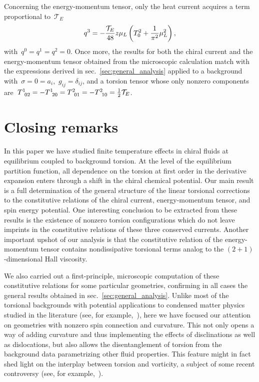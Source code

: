 \documentclass[11pt,a4paper]{article}
\begin{document}
Concerning the energy-momentum tensor, only the heat current acquires a term
proportional to~$\mathcal{T}_{E}$
\begin{align}
q^{3}=-{\mathcal{T}_{E}\over 48}z\mu_{L}\left( T_{0}^{2}+{1\over \pi^{2}}\mu_{L}^{2}\right),
\end{align}
with~$q^{0}=q^{1}=q^{2}=0$. Once more, the results for
both the chiral current and the energy-momentum tensor obtained from the microscopic calculation 
match with the expressions derived in sec.~\ref{sec:general_analysis} applied to a background 
with~$\sigma=0=a_{i}$,~$g_{ij}=\delta_{ij}$, and a torsion tensor whose
only nonzero components are~$T^{1}_{\,\,\,02}=-T^{1}_{\,\,\,20}=T^{2}_{\,\,\,01}
=-T^{2}_{\,\,\,10}={1\over 2}\mathcal{T}_{E}$.


\section{Closing remarks}
\label{sec:conclusions}

In this paper we have studied finite 
temperature effects in chiral fluids at equilibrium coupled to background torsion.
At the level of the equilibrium partition function,
all dependence on the torsion at 
first order in the derivative expansion enters through a shift in the chiral chemical potential. 
Our main result is a full determination of the general structure of
the linear torsional corrections to the 
constitutive relations of the chiral current, energy-momentum tensor, 
and spin energy potential. One interesting conclusion to be extracted from these results
is the existence of nonzero
torsion configurations which do not 
leave imprints in the constitutive relations of these three conserved currents.  
Another important upshot of our analysis is that the constitutive relation of the 
energy-momentum tensor contains nondissipative torsional
terms analog to the $(2+1)$-dimensional Hall viscosity. 

We also carried out a first-principle, microscopic computation of these 
constitutive relations for some particular 
geometries, confirming in all 
cases the general results obtained in sec.~\ref{sec:general_analysis}.
Unlike most of the torsional backgrounds with potential
applications to condensed matter physics studied in the literature
(see, for
example,~\cite{Hughes:2012vg,Parrikar:2014usa,Khaidukov:2018oat,Huang:2019haq,
Nissinen:2019mkw,Huang:2020ypv,Laurila:2020yll}), here we have focused our attention on geometries
with nonzero spin connection and curvature. This not only opens a way of 
adding curvature and thus implementing 
the effects of disclinations as well as dislocations, but also allows the disentanglement of  
torsion from the background data parametrizing other fluid properties. 
This feature might in fact shed light on the interplay between torsion and vorticity, 
a subject of some recent controversy
(see, for example,~\cite{Ferreiros:2020uda,Chernodub:2021nff,Nissinen:2021gke}).
\end{document}
